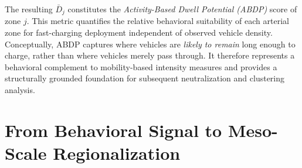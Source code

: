 \documentclass[conference]{IEEEtran}
\begin{document}
The resulting $\bar{D}_j$ constitutes the
\emph{Activity-Based Dwell Potential (ABDP)} score of zone $j$.
This metric quantifies the relative behavioral suitability of each
arterial zone for fast-charging deployment independent of observed
vehicle density.
Conceptually, ABDP captures where vehicles are \emph{likely to remain}
long enough to charge, rather than where vehicles merely pass through.
It therefore represents a behavioral complement to mobility-based
intensity measures and provides a structurally grounded foundation for
subsequent neutralization and clustering analysis.


\section{From Behavioral Signal to Meso-Scale Regionalization}
\end{document}
